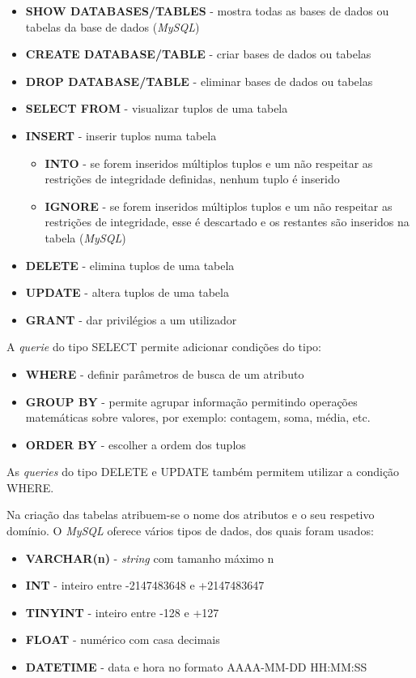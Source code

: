 \documentclass[11pt,twoside,a4paper]{report}
\begin{document}
\begin{itemize}
	\item \textbf{SHOW DATABASES/TABLES} - mostra todas as bases de dados ou tabelas da base de dados (\textit{MySQL})
	\item \textbf{CREATE DATABASE/TABLE} - criar bases de dados ou tabelas
	\item \textbf{DROP DATABASE/TABLE} - eliminar bases de dados ou tabelas
	\item \textbf{SELECT FROM} - visualizar tuplos de uma tabela
	\item \textbf{INSERT} - inserir tuplos numa tabela
	\begin{itemize}
		\item \textbf{INTO} - se forem inseridos múltiplos tuplos e um não respeitar as restrições de integridade definidas, nenhum tuplo é inserido
		\item \textbf{IGNORE} - se forem inseridos múltiplos tuplos e um não respeitar as restrições de integridade, esse é descartado e os restantes são inseridos na tabela (\textit{MySQL})
	\end{itemize}
	\item \textbf{DELETE} - elimina tuplos de uma tabela
	\item \textbf{UPDATE} - altera tuplos de uma tabela
	\item \textbf{GRANT} - dar privilégios a um utilizador
\end{itemize}
A \textit{querie} do tipo SELECT permite adicionar condições do tipo:
\begin{itemize}
	\item \textbf{WHERE} - definir parâmetros de busca de um atributo
	\item \textbf{GROUP BY} - permite agrupar informação permitindo operações matemáticas sobre valores, por exemplo: contagem, soma, média, etc.
	\item \textbf{ORDER BY} - escolher a ordem dos tuplos
\end{itemize}
As \textit{queries} do tipo DELETE e UPDATE  também permitem utilizar a condição WHERE.\par 
Na criação das tabelas atribuem-se o nome dos atributos e o seu respetivo domínio. O \textit{MySQL} oferece vários tipos de dados, dos quais foram usados:
\begin{itemize}
	\item \textbf{VARCHAR(n)} - \textit{string} com tamanho máximo n
	\item \textbf{INT} - inteiro entre -2147483648 e +2147483647
	\item \textbf{TINYINT} - inteiro entre -128 e +127
	\item \textbf{FLOAT} - numérico com casa decimais
	\item \textbf{DATETIME} - data e hora no formato AAAA-MM-DD HH:MM:SS
\end{itemize}
\end{document}
